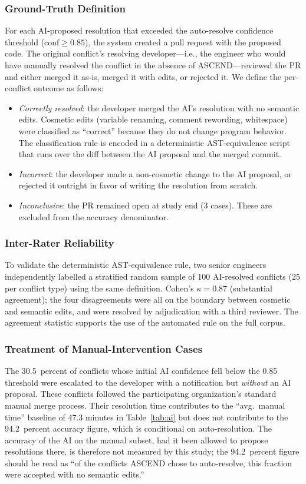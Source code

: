 \documentclass{ieeeaccess}
\begin{document}
\subsubsection{Ground-Truth Definition}
For each AI-proposed resolution that exceeded the auto-resolve confidence threshold ($\mathrm{conf} \geq 0.85$), the system created a pull request with the proposed code. The original conflict's resolving developer---i.e., the engineer who would have manually resolved the conflict in the absence of ASCEND---reviewed the PR and either merged it as-is, merged it with edits, or rejected it. We define the per-conflict outcome as follows:
\begin{itemize}
\item \textit{Correctly resolved}: the developer merged the AI's resolution with no semantic edits. Cosmetic edits (variable renaming, comment rewording, whitespace) were classified as ``correct'' because they do not change program behavior. The classification rule is encoded in a deterministic AST-equivalence script that runs over the diff between the AI proposal and the merged commit.
\item \textit{Incorrect}: the developer made a non-cosmetic change to the AI proposal, or rejected it outright in favor of writing the resolution from scratch.
\item \textit{Inconclusive}: the PR remained open at study end (3 cases). These are excluded from the accuracy denominator.
\end{itemize}

\subsubsection{Inter-Rater Reliability}
To validate the deterministic AST-equivalence rule, two senior engineers independently labelled a stratified random sample of 100 AI-resolved conflicts (25 per conflict type) using the same definition. Cohen's $\kappa = 0.87$ (substantial agreement); the four disagreements were all on the boundary between cosmetic and semantic edits, and were resolved by adjudication with a third reviewer. The agreement statistic supports the use of the automated rule on the full corpus.

\subsubsection{Treatment of Manual-Intervention Cases}
The 30.5~percent of conflicts whose initial AI confidence fell below the 0.85 threshold were escalated to the developer with a notification but \emph{without} an AI proposal. These conflicts followed the participating organization's standard manual merge process. Their resolution time contributes to the ``avg.\ manual time'' baseline of 47.3 minutes in Table~\ref{tab:ai} but does not contribute to the 94.2~percent accuracy figure, which is conditional on auto-resolution. The accuracy of the AI on the manual subset, had it been allowed to propose resolutions there, is therefore not measured by this study; the 94.2~percent figure should be read as ``of the conflicts ASCEND chose to auto-resolve, this fraction were accepted with no semantic edits.''
\end{document}
